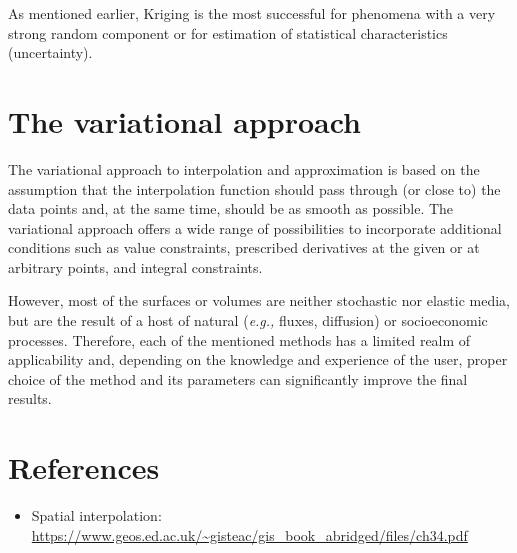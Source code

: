 \documentclass{article}
\begin{document}
As mentioned earlier, Kriging is the most successful for phenomena with a very strong random component or for estimation of statistical characteristics (uncertainty).

\section{The variational approach}
The variational approach to interpolation and approximation is based on the assumption that the interpolation function should pass through (or close to) the data points and, at the same time, should be as smooth as possible. The variational approach offers a wide range of possibilities to incorporate additional conditions such as value constraints, prescribed derivatives at the given or at arbitrary points, and integral constraints.

However, most of the surfaces or volumes are neither stochastic nor elastic media, but are the result of a host of natural (\textit{e.g.,} fluxes, diffusion) or socioeconomic processes. Therefore, each of the mentioned methods has a limited realm of applicability and, depending on the knowledge and experience of the user, proper choice of the method and its parameters can significantly improve the final results. 

\section*{References}
\begin{itemize}
    \item Spatial interpolation: \url{https://www.geos.ed.ac.uk/~gisteac/gis_book_abridged/files/ch34.pdf}
\end{itemize}
\end{document}
